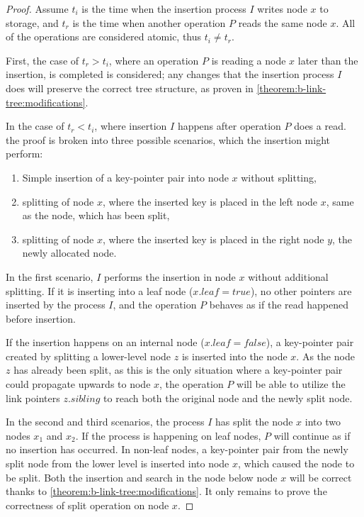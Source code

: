 \begin{proof}
  Assume $t_i$ is the time when the insertion process $I$ writes node $x$ to storage, and $t_r$ is the time when another operation $P$ reads the same node $x$. All of the operations are considered atomic, thus $t_i \neq t_r$.

  First, the case of $t_r > t_i$, where an operation $P$ is reading a node $x$ later than the insertion, is completed is considered; any changes that the insertion process $I$ does will preserve the correct tree structure, as proven in \cref{theorem:b-link-tree:modifications}.

  In the case of $t_r < t_i$, where insertion $I$ happens after operation $P$ does a read. the proof is broken into three possible scenarios, which the insertion might perform:

  \begin{enumerate}
    \item Simple insertion of a key-pointer pair into node $x$ without splitting,
    \item splitting of node $x$, where the inserted key is placed in the left node $x$, same as the node, which has been split,
    \item splitting of node $x$, where the inserted key is placed in the right node $y$, the newly allocated node.
  \end{enumerate}

  In the first scenario, $I$ performs the insertion in node $x$ without additional splitting. If it is inserting into a leaf node ($x.leaf = true$), no other pointers are inserted by the process $I$, and the operation $P$ behaves as if the read happened before insertion.

  If the insertion happens on an internal node ($x.leaf = false$), a key-pointer pair created by splitting a lower-level node $z$ is inserted into the node $x$. As the node $z$ has already been split, as this is the only situation where a key-pointer pair could propagate upwards to node $x$, the operation $P$ will be able to utilize the link pointers $z.sibling$ to reach both the original node and the newly split node.

  In the second and third scenarios, the process $I$ has split the node $x$ into two nodes $x_1$ and $x_2$. If the process is happening on leaf nodes, $P$ will continue as if no insertion has occurred. In non-leaf nodes, a key-pointer pair from the newly split node from the lower level is inserted into node $x$, which caused the node to be split. Both the insertion and search in the node below node $x$ will be correct thanks to \cref{theorem:b-link-tree:modifications}. It only remains to prove the correctness of split operation on node $x$.


\end{proof}
